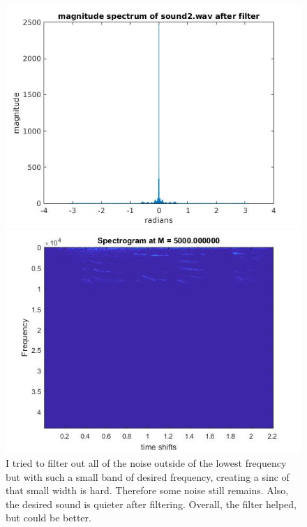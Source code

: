\documentclass{article}
\begin{document}
\begin{figure}[H]
\includegraphics[scale = .5]{report7_3}
\includegraphics[scale = .5]{report7_4}
\\ I tried to filter out all of the noise outside of the lowest frequency but with such a small band of desired frequency, creating a sinc of that small width is hard. Therefore some noise still remains.
Also, the desired sound is quieter after filtering. Overall, the filter helped, but could be better.
\end{figure}
\end{document}
